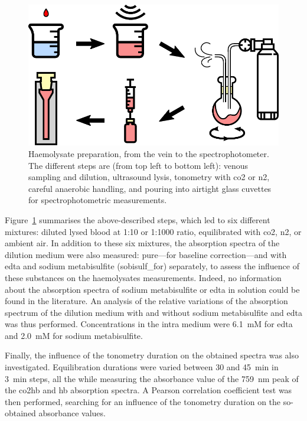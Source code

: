 \begin{figure}
	\centering
	\includegraphics[width=0.95\linewidth]{1_main_matter/co2hb_figures/mes_chain.pdf}
	\caption[Haemolysate preparation, from the vein to the spectrophotometer.]{Haemolysate preparation, from the vein to the spectrophotometer. The different steps are (from top left to bottom left): venous sampling and dilution, ultrasound lysis, tonometry with \gls{co2} or \gls{n2}, careful anaerobic handling, and pouring into airtight glass cuvettes for spectrophotometric measurements.}
	\label{fig:co2hb:co2hb_mes_chain}
\end{figure}

Figure~\ref{fig:co2hb:co2hb_mes_chain} summarises the above-described steps, which led to six different mixtures: diluted lysed blood at 1:10 or 1:1000 ratio, equilibrated with \gls{co2}, \gls{n2}, or ambient air. In addition to these six mixtures, the absorption spectra of the dilution medium were also measured: pure---for baseline correction---and with \gls{edta} and sodium metabisulfite (\gls{sobisulf_for}) separately, to assess the influence of these substances on the haemolysates measurements. Indeed, no information about the absorption spectra of sodium metabisulfite or \gls{edta} in solution could be found in the literature. An analysis of the relative variations of the absorption spectrum of the dilution medium with and without sodium metabisulfite and \gls{edta} was thus performed. Concentrations in the intra medium were 6.1~mM for \gls{edta} and 2.0~mM for sodium metabisulfite.

Finally, the influence of the tonometry duration on the obtained spectra was also investigated. Equilibration durations were varied between 30 and 45~min in 3~min steps, all the while measuring the absorbance value of the 759~nm peak of the \gls{co2hb} and \gls{hb} absorption spectra. A Pearson correlation coefficient test was then performed, searching for an influence of the tonometry duration on the so-obtained absorbance values.

